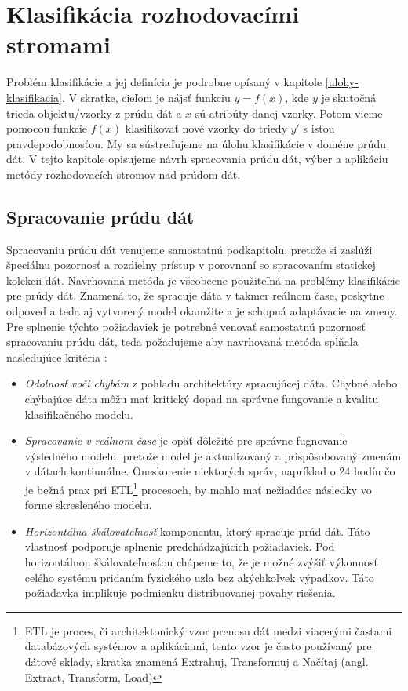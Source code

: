\chapter{Klasifikácia rozhodovacími stromami}
\label{Klasifikácia rozhodovacími stromami}
Problém klasifikácie a jej definícia je podrobne opísaný v kapitole \ref{ulohy-klasifikacia}. V skratke, cieľom je nájsť funkciu $y = f(x)$, kde $y$ je skutočná trieda objektu/vzorky z prúdu dát a $x$ sú atribúty danej vzorky. Potom vieme pomocou funkcie $f(x)$ klasifikovať nové vzorky do triedy $y'$ s istou pravdepodobnosťou. My sa sústreďujeme na úlohu klasifikácie v doméne prúdu dát. V tejto kapitole opisujeme návrh spracovania prúdu dát, výber a aplikáciu metódy rozhodovacích stromov nad prúdom dát.

\section{Spracovanie prúdu dát}
\label{method-spracovanie-prudu-dat}

Spracovaniu prúdu dát venujeme samostatnú podkapitolu, pretože si zaslúži špeciálnu pozornosť a rozdielny prístup v porovnaní so spracovaním statickej kolekcii dát. Navrhovaná metóda je všeobecne použiteľná na problémy klasifikácie pre prúdy dát. Znamená to, že spracuje dáta v takmer reálnom čase, poskytne odpoveď a teda aj vytvorený model okamžite a je schopná adaptávacie na zmeny. Pre splnenie týchto požiadaviek je potrebné venovať samostatnú pozornosť spracovaniu prúdu dát, teda požadujeme aby navrhovaná metóda spĺňala nasledujúce kritéria \citep{cimerman2015prudy}:
\begin{itemize}
	\item \textit{Odolnosť voči chybám} z pohľadu architektúry spracujúcej dáta. Chybné alebo chýbajúce dáta môžu mať kritický dopad na správne fungovanie a kvalitu klasifikačného modelu.
	\item \textit{Spracovanie v reálnom čase} je opäť dôležité pre správne fugnovanie výsledného modelu, pretože model je aktualizovaný a prispôsobovaný zmenám v dátach kontiunálne. Oneskorenie niektorých správ, napríklad o 24 hodín čo je bežná prax pri ETL\footnote{ETL je proces, či architektonický vzor prenosu dát medzi viacerými častami databázových systémov  a aplikáciami, tento vzor je často používaný pre dátové sklady, skratka znamená Extrahuj, Transformuj a Načítaj (angl. Extract, Transform, Load)} procesoch, by mohlo mať nežiadúce následky vo forme skresleného modelu.
	\item \textit{Horizontálna škálovateľnosť} komponentu, ktorý spracuje prúd dát. Táto vlastnosť podporuje splnenie predchádzajúcich požiadaviek. Pod horizontálnou škálovateľnosťou chápeme to, že je možné zvýšiť výkonnosť celého systému pridaním fyzického uzla bez akýchkoľvek výpadkov. Táto požiadavka implikuje podmienku distribuovanej povahy riešenia.
\end{itemize}


